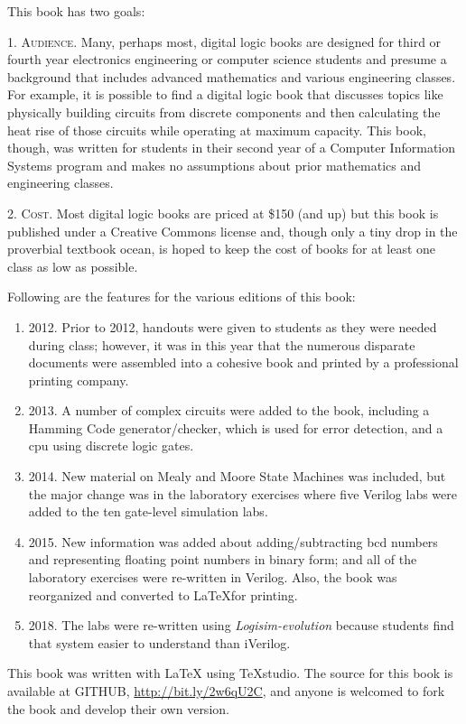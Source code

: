 This book has two goals:

1. \textsc{Audience}. Many, perhaps most, digital logic books are designed for third or fourth year electronics engineering or computer science students and presume a background that includes advanced mathematics and various engineering classes. For example, it is possible to find a digital logic book that discusses topics like physically building circuits from discrete components and then calculating the heat rise of those circuits while operating at maximum capacity. This book, though, was written for students in their second year of a Computer Information Systems program and makes no assumptions about prior mathematics and engineering classes.

2. \textsc{Cost}. Most digital logic books are priced at \$150 (and up) but this book is published under a Creative Commons license and, though only a tiny drop in the proverbial textbook ocean, is hoped to keep the cost of books for at least one class as low as possible.

Following are the features for the various editions of this book:

\begin{enumerate}
  \item 2012. Prior to 2012, handouts were given to students as they were needed during class; however, it was in this year that the numerous disparate documents were assembled into a cohesive book and printed by a professional printing company.
  \item 2013. A number of complex circuits were added to the book, including a Hamming Code generator/checker, which is used for error detection, and a \gls{cpu} using discrete logic gates.
  \item 2014. New material on Mealy and Moore State Machines was included, but the major change was in the laboratory exercises where five Verilog labs were added to the ten gate-level simulation labs.
  \item 2015. New information was added about adding/subtracting \gls{bcd} numbers and representing floating point numbers in binary form; and all of the laboratory exercises were re-written in Verilog. Also, the book was reorganized and converted to \LaTeX for printing.
  \item 2018. The labs were re-written using \textit{Logisim-evolution} because students find that system easier to understand than iVerilog.
\end{enumerate}

This book was written with \LaTeX \: using TeXstudio. The source for this book is available at GITHUB, \url{http://bit.ly/2w6qU2C}, and anyone is welcomed to fork the book and develop their own version. 

